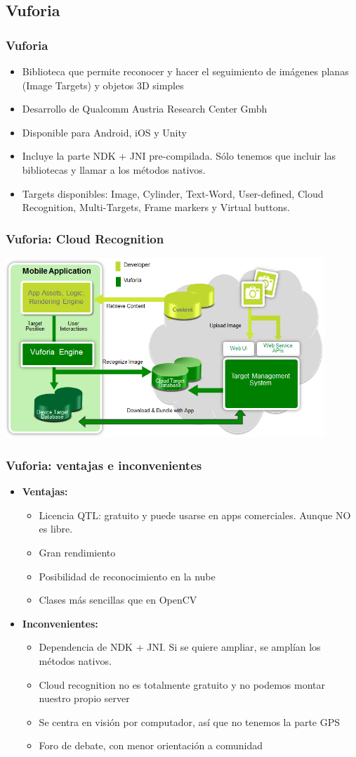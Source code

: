 \subsection*{Vuforia}
\frame
{
\frametitle{Vuforia}
\begin{itemize}
 \item Biblioteca que permite reconocer y hacer el seguimiento de imágenes planas (Image Targets) y objetos 3D simples
 \item Desarrollo de Qualcomm Austria Research Center Gmbh
 \item Disponible para Android, iOS y Unity
 \item Incluye la parte NDK + JNI pre-compilada. Sólo tenemos que incluir las bibliotecas y llamar a los métodos nativos.
 \item Targets disponibles: Image, Cylinder, Text-Word, User-defined, Cloud Recognition, Multi-Targets, Frame markers y Virtual buttons.
\end{itemize}
}

\frame
{
\frametitle{Vuforia: Cloud Recognition}
 \includegraphics[width=12cm]{imgs/vuforia-components.png}
}

\frame
{
\frametitle{Vuforia: ventajas e inconvenientes}
\begin{itemize}
\item \textbf{Ventajas:}
  \begin{itemize}
   \item Licencia QTL: gratuito y puede usarse en apps comerciales. Aunque NO es libre.
   \item Gran rendimiento
   \item Posibilidad de reconocimiento en la nube
   \item Clases más sencillas que en OpenCV
  \end{itemize}

\item \textbf{Inconvenientes:}
  \begin{itemize}
   \item Dependencia de NDK + JNI. Si se quiere ampliar, se amplían los métodos nativos.
   \item Cloud recognition no es totalmente gratuito y no podemos montar nuestro propio server
   \item Se centra en visión por computador, así que no tenemos la parte GPS
   \item Foro de debate, con menor orientación a comunidad
  \end{itemize}

\end{itemize}
}

